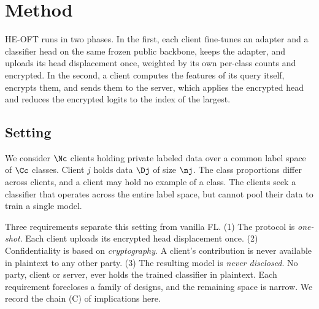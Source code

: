\section{Method}
\label{sec:method}

HE-OFT runs in two phases. In the first, each client fine-tunes an adapter
and a classifier head on the same frozen public backbone, keeps the adapter, and
uploads its head displacement once, weighted by its own per-class counts and
encrypted. In the second, a client computes the features of its query
itself, encrypts them, and sends them to the server, which applies the
encrypted head and reduces the encrypted logits to the index of the largest.

\subsection{Setting}
\label{sec:setting}

We consider $\Nc$ clients holding private labeled data over a common label space
of $\Cc$ classes. Client $j$ holds data $\Dj$ of size $\nj$. The class proportions
differ across clients, and a client may hold no example of a class. The clients seek a classifier that operates across the entire label space, but cannot pool their data to train a single model.

Three requirements separate this setting from vanilla FL. (1) The
protocol is \emph{one-shot}. Each client uploads its encrypted head displacement once. (2) Confidentiality is based on \emph{cryptography}. A client's contribution is never
available in plaintext to any other party. (3) The resulting model is
\emph{never disclosed}. No party, client or server, ever holds the trained
classifier in plaintext. Each requirement forecloses a family of designs, and the remaining space is narrow. We record the chain (C) of implications here.

